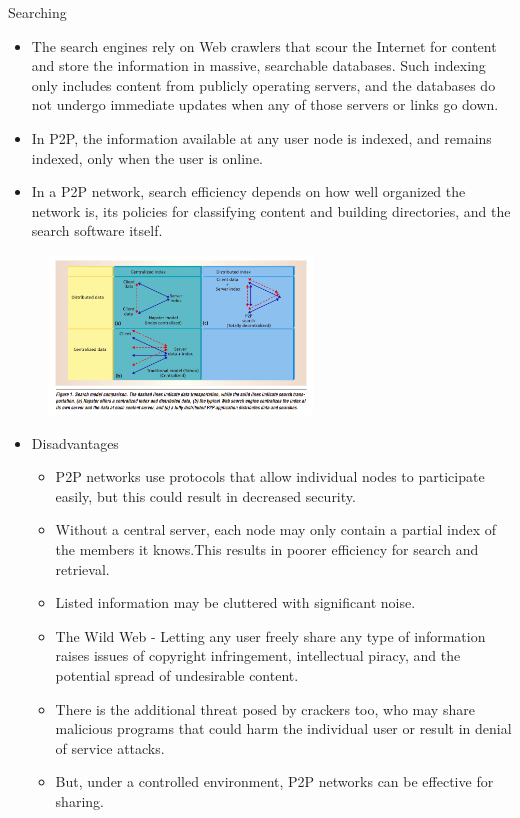 \documentclass[9pt]{beamer}
\begin{document}
\begin{frame}{Searching}
    \begin{itemize}
        \item The search engines rely on Web crawlers that scour the Internet for content and store the information in massive, searchable databases. Such indexing only includes content from publicly operating servers, and the databases do not undergo immediate updates when any of those servers or links go down.
        \item In P2P, the information available at any user node is indexed, and remains indexed, only when the user is online.
        \item In a P2P network, search efficiency depends on how well organized the network is, its policies for classifying content and building directories, and the search software itself.
    \end{itemize}
     \begin{figure}
      \centering
      \includegraphics[width=7cm]{search.png}
  \end{figure}
\end{frame}
\begin{frame}{}
\begin{itemize}
    \item Disadvantages
\begin{itemize}
   \item P2P networks use protocols that allow individual nodes to participate easily, but this could result in decreased security. 
\item Without a central server, each node may only contain a partial index of the members it knows.This results in poorer efficiency for search and retrieval. 
\item Listed information may be cluttered with significant noise.
\item The Wild Web - Letting any user freely share any type of information raises issues of copyright infringement, intellectual piracy, and the potential spread of undesirable content.
\item There is the additional threat posed by crackers too, who may share malicious programs that could harm the individual user or result in denial of service attacks. 

\item But, under a controlled environment, P2P networks can be effective for sharing.
\end{itemize}
\end{itemize}
\end{frame}
\end{document}
